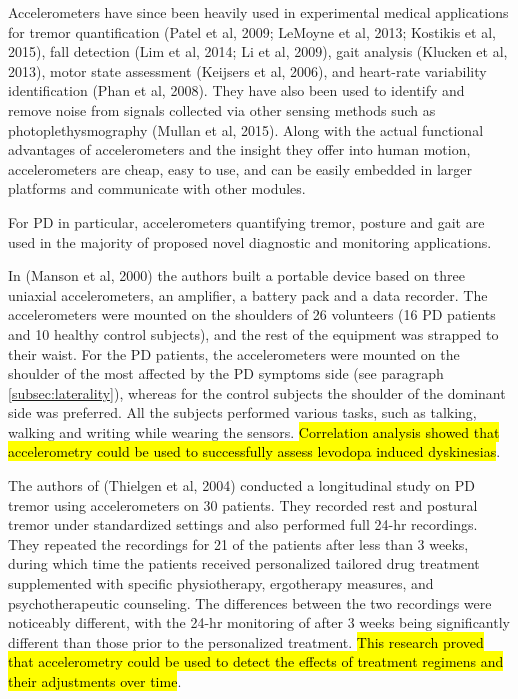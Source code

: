 Accelerometers have since been heavily used in experimental medical applications for tremor quantification (Patel et al, 2009; LeMoyne et al, 2013; Kostikis et al, 2015), fall detection (Lim et al, 2014; Li et al, 2009), gait analysis (Klucken et al, 2013), motor state assessment (Keijsers et al, 2006), and heart-rate variability identification (Phan et al, 2008). They have also been used to identify and remove noise from signals collected via other sensing methods such as photoplethysmography (Mullan et al, 2015). Along with the actual functional advantages of accelerometers and the insight they offer into human motion, accelerometers are cheap, easy to use, and can be easily embedded in larger platforms and communicate with other modules.

For \gls{PD} in particular, accelerometers quantifying tremor, posture and gait are used in the majority of proposed novel diagnostic and monitoring applications.

In (Manson et al, 2000) the authors built a portable device based on three uniaxial accelerometers, an amplifier, a battery pack and a data recorder. The accelerometers were mounted on the shoulders of 26 volunteers (16 \gls{PD} patients and 10 healthy control subjects), and the rest of the equipment was strapped to their waist. For the \gls{PD} patients, the accelerometers were mounted on the shoulder of the most affected by the \gls{PD} symptoms side (see paragraph \ref{subsec:laterality}), whereas for the control subjects the shoulder of the dominant side was preferred. All the subjects performed various tasks, such as talking, walking and writing while wearing the sensors. \hl{Correlation analysis showed that accelerometry could be used to successfully assess levodopa induced dyskinesias}. 

The authors of (Thielgen et al, 2004) conducted a longitudinal study on \gls{PD} tremor using accelerometers on 30 patients. They recorded rest and postural tremor under standardized settings and also performed full 24-hr recordings. They repeated the recordings for 21 of the patients after less than 3 weeks, during which time the patients received personalized tailored drug treatment supplemented with specific physiotherapy, ergotherapy measures, and psychotherapeutic counseling. The differences between the two recordings were noticeably different, with the 24-hr monitoring of after 3 weeks being significantly different than those prior to the personalized treatment. \hl{This research proved that accelerometry could be used to detect the effects of treatment regimens and their adjustments over time}.

